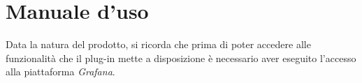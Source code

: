 \section{Manuale d'uso}\label{Man}

Data la natura del prodotto, si ricorda che prima di poter accedere alle funzionalità che il plug-in mette a disposizione è necessario aver eseguito l'accesso alla piattaforma \textit{Grafana}.



\pagebreak



\pagebreak



\pagebreak



\pagebreak



\pagebreak



\pagebreak



\pagebreak



\pagebreak



\pagebreak





\pagebreak



\pagebreak




